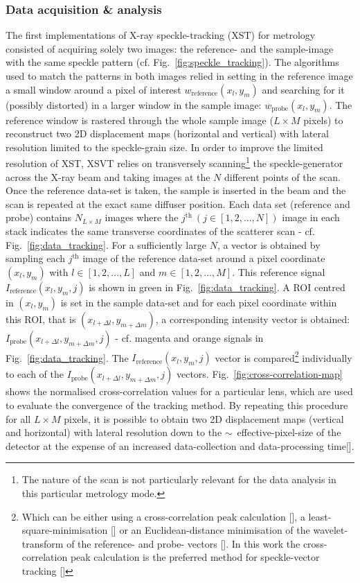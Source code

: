 \begin{refsection}
\subsubsection*{Data acquisition \& analysis}

The first implementations of X-ray speckle-tracking (XST) for metrology consisted of acquiring solely two images: the reference- and the sample-image with the same speckle pattern (cf. Fig.~\ref{fig:speckle_tracking}). The algorithms used to match the patterns in both images relied in setting in the reference image a small window around a pixel of interest $w_\text{reference}(x_l,y_m)$ and searching for it (possibly distorted) in a larger window in the sample image: $w_\text{probe}(x_l,y_m)$. The reference window is rastered through the whole sample image ($L\times M$ pixels) to reconstruct two 2D displacement maps (horizontal and vertical) with lateral resolution limited to the speckle-grain size. In order to improve the limited resolution of XST, XSVT relies on transversely scanning\footnote{The nature of the scan is not particularly relevant for the data analysis in this particular metrology mode.} the speckle-generator across the X-ray beam and taking images at the $N$ different points of the scan. Once the reference data-set is taken, the sample is inserted in the beam and the scan is repeated at the exact same diffuser position. Each data set (reference and probe) contains $N_{L\times M}$ images where the $j^\text{th}~(j\in[1,2,...,N])$ image in each stack indicates the same transverse coordinates of the scatterer scan - cf. Fig.~\ref{fig:data_tracking}. For a sufficiently large $N$, a vector is obtained by sampling each $j^\text{th}$ image of the reference data-set around a pixel coordinate $(x_l,y_m)$ with $l\in[1,2,...,L]$ and $m\in[1,2,...,M]$. This reference signal $I_{\text{reference}}(x_l,y_m,j)$ is shown in green in Fig.~\ref{fig:data_tracking}. A ROI centred in $(x_l,y_m)$ is set in the sample data-set and for each pixel coordinate within this ROI, that is $(x_{l+\Delta l},y_{m+\Delta m})$, a corresponding intensity vector is obtained: $I_{\text{probe}}(x_{l+\Delta l},y_{m+\Delta m},j)$ - cf. magenta and orange signals in Fig.~\ref{fig:data_tracking}. The $I_{\text{reference}}(x_l,y_m,j)$ vector is compared\footnote{Which can be either using a cross-correlation peak calculation [\cite{Berujon2012, Morgan2012}], a least-square-minimisation [\cite{Zanette2014, Zdora2017}] or an Euclidean-distance minimisation of the wavelet-transform of the reference- and probe- vectors [\cite{Qiao2020b}].  In this work the cross-correlation peak calculation is the preferred method for speckle-vector tracking [\cite{Berujon2012, Morgan2012}]} individually to each of the $I_{\text{probe}}(x_{l+\Delta l},y_{m+\Delta m},j)$ vectors. Fig.~\ref{fig:cross-correlation-map} shows the normalised cross-correlation values for a particular lens, which are used to evaluate the convergence of the tracking method. By repeating this procedure for all $L\times M$ pixels, it is possible to obtain two 2D displacement maps (vertical and horizontal) with lateral resolution down to the $\sim$~effective-pixel-size of the detector at the expense of an increased data-collection and data-processing time[\cite{Berujon2016,Berujon2020}].


\end{refsection}
